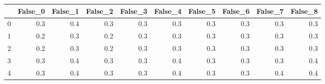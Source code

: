\begin{tabular}{lrrrrrrrrr}
\toprule
{} &  False\_0 &  False\_1 &  False\_2 &  False\_3 &  False\_4 &  False\_5 &  False\_6 &  False\_7 &  False\_8 \\ \hline
\midrule
0 &      0.3 &      0.4 &      0.3 &      0.3 &      0.3 &      0.3 &      0.3 &      0.3 &      0.3 \\ \hline
1 &      0.2 &      0.3 &      0.2 &      0.3 &      0.3 &      0.3 &      0.3 &      0.3 &      0.3 \\ \hline
2 &      0.2 &      0.3 &      0.2 &      0.3 &      0.3 &      0.3 &      0.3 &      0.3 &      0.3 \\ \hline
3 &      0.3 &      0.4 &      0.3 &      0.3 &      0.4 &      0.3 &      0.3 &      0.3 &      0.4 \\ \hline
4 &      0.3 &      0.4 &      0.3 &      0.3 &      0.4 &      0.3 &      0.3 &      0.4 &      0.4 \\ \hline
\bottomrule
\end{tabular}
